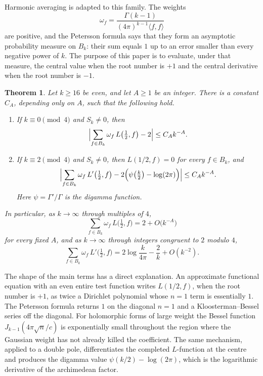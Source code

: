 \documentclass[11pt]{amsart}
\newtheorem{theorem}{Theorem}[section]
\theoremstyle{definition}
\theoremstyle{remark}
\numberwithin{equation}{section}
\begin{document}
Harmonic averaging is adapted to this family. The weights
\[
\omega_f=\frac{\Gamma(k-1)}{(4\pi)^{k-1}\langle f,f\rangle}
\]
are positive, and the Petersson formula says that they form an asymptotic probability measure on $B_k$: their sum equals $1$ up to an error smaller than every negative power of $k$. The purpose of this paper is to evaluate, under that measure, the central value when the root number is $+1$ and the central derivative when the root number is $-1$.

\begin{theorem}\label{thm:main}
Let $k\ge 16$ be even, and let $A\ge 1$ be an integer. There is a constant $C_A$, depending only on $A$, such that the following hold.
\begin{enumerate}[label=\rm(\roman*)]
\item If $k\equiv 0\pmod 4$ and $S_k\neq 0$, then
\[
\Bigl|\sum_{f\in B_k}\omega_f\, L\bigl(\tfrac12,f\bigr)-2\Bigr|\le C_A k^{-A}.
\]
\item If $k\equiv 2\pmod 4$ and $S_k\neq 0$, then $L(1/2,f)=0$ for every $f\in B_k$, and
\[
\Bigl|\sum_{f\in B_k}\omega_f\, L'\bigl(\tfrac12,f\bigr)
-2\Bigl(\psi\bigl(\tfrac k2\bigr)-\log(2\pi)\Bigr)\Bigr|
\le C_A k^{-A}.
\]
Here $\psi=\Gamma'/\Gamma$ is the digamma function.
\end{enumerate}
In particular, as $k\to\infty$ through multiples of $4$,
\[
\sum_{f\in B_k}\omega_f\, L\bigl(\tfrac12,f\bigr)=2+O\bigl(k^{-A}\bigr)
\]
for every fixed $A$, and as $k\to\infty$ through integers congruent to $2$ modulo $4$,
\begin{equation}\label{eq:digamma-expansion}
\sum_{f\in B_k}\omega_f\, L'\bigl(\tfrac12,f\bigr)
=2\log\frac{k}{4\pi}-\frac{2}{k}+O(k^{-2}).
\end{equation}
\end{theorem}

The shape of the main terms has a direct explanation. An approximate functional equation with an even entire test function writes $L(1/2,f)$, when the root number is $+1$, as twice a Dirichlet polynomial whose $n=1$ term is essentially $1$. The Petersson formula returns $1$ on the diagonal $n=1$ and a Kloosterman--Bessel series off the diagonal. For holomorphic forms of large weight the Bessel function $J_{k-1}(4\pi\sqrt n/c)$ is exponentially small throughout the region where the Gaussian weight has not already killed the coefficient. The same mechanism, applied to a double pole, differentiates the completed $L$-function at the centre and produces the digamma value $\psi(k/2)-\log(2\pi)$, which is the logarithmic derivative of the archimedean factor.
\end{document}
